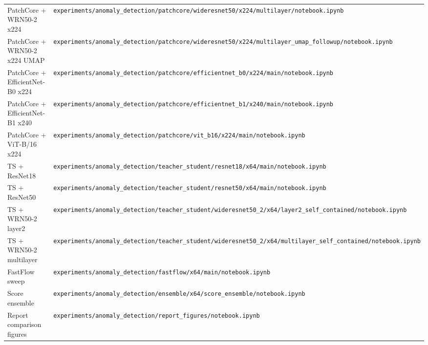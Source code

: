 \documentclass[11pt]{article}
\begin{document}
\begin{table}[H]
\begin{tabularx}{\linewidth}{>{\raggedright\arraybackslash}X>{\raggedright\arraybackslash}X}
PatchCore + WRN50-2 x224
  & \texttt{experiments/anomaly\_detection/patchcore/wideresnet50/x224/multilayer/notebook.ipynb} \\
PatchCore + WRN50-2 x224 UMAP
  & \texttt{experiments/anomaly\_detection/patchcore/wideresnet50/x224/multilayer\_umap\_followup/notebook.ipynb} \\
PatchCore + EfficientNet-B0 x224
  & \texttt{experiments/anomaly\_detection/patchcore/efficientnet\_b0/x224/main/notebook.ipynb} \\
PatchCore + EfficientNet-B1 x240
  & \texttt{experiments/anomaly\_detection/patchcore/efficientnet\_b1/x240/main/notebook.ipynb} \\
PatchCore + ViT-B/16 x224
  & \texttt{experiments/anomaly\_detection/patchcore/vit\_b16/x224/main/notebook.ipynb} \\
TS + ResNet18
  & \texttt{experiments/anomaly\_detection/teacher\_student/resnet18/x64/main/notebook.ipynb} \\
TS + ResNet50
  & \texttt{experiments/anomaly\_detection/teacher\_student/resnet50/x64/main/notebook.ipynb} \\
TS + WRN50-2 layer2
  & \texttt{experiments/anomaly\_detection/teacher\_student/wideresnet50\_2/x64/layer2\_self\_contained/notebook.ipynb} \\
TS + WRN50-2 multilayer
  & \texttt{experiments/anomaly\_detection/teacher\_student/wideresnet50\_2/x64/multilayer\_self\_contained/notebook.ipynb} \\
FastFlow sweep
  & \texttt{experiments/anomaly\_detection/fastflow/x64/main/notebook.ipynb} \\
Score ensemble
  & \texttt{experiments/anomaly\_detection/ensemble/x64/score\_ensemble/notebook.ipynb} \\
Report comparison figures
  & \texttt{experiments/anomaly\_detection/report\_figures/notebook.ipynb} \\
\bottomrule
\end{tabularx}
\end{table}
\end{document}
